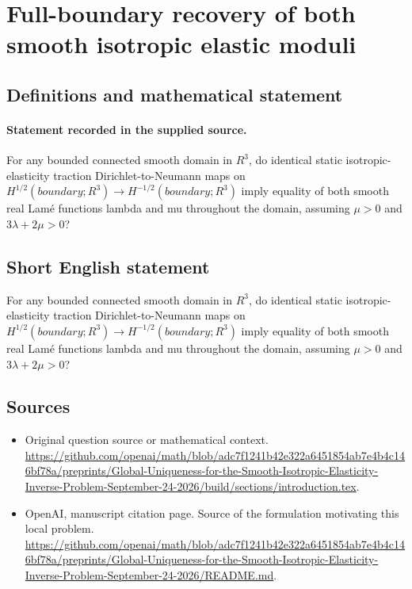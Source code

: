 \documentclass[11pt]{article}
\begin{document}
\section*{Full-boundary recovery of both smooth isotropic elastic moduli}\label{statement}
\subsection{Definitions and mathematical statement}
\paragraph{Statement recorded in the supplied source.}
For any bounded connected smooth domain in $R^3$, do identical static isotropic-elasticity traction Dirichlet-to-Neumann maps on $H^{1/2}(boundary;R^3)\to H^{-1/2}(boundary;R^3)$ imply equality of both smooth real Lamé functions lambda and mu throughout the domain, assuming $\mu >0$ and $3\lambda +2\mu >0$?
\subsection{Short English statement}
For any bounded connected smooth domain in $R^3$, do identical static isotropic-elasticity traction Dirichlet-to-Neumann maps on $H^{1/2}(boundary;R^3)\to H^{-1/2}(boundary;R^3)$ imply equality of both smooth real Lamé functions lambda and mu throughout the domain, assuming $\mu >0$ and $3\lambda +2\mu >0$?
\subsection{Sources}
\begin{itemize}
\item[S1] Original question source or mathematical context.
\url{https://github.com/openai/math/blob/adc7f1241b42e322a6451854ab7e4b4c146bf78a/preprints/Global-Uniqueness-for-the-Smooth-Isotropic-Elasticity-Inverse-Problem-September-24-2026/build/sections/introduction.tex}.
\item[S2] OpenAI, manuscript citation page. Source of the formulation motivating this local problem.
\url{https://github.com/openai/math/blob/adc7f1241b42e322a6451854ab7e4b4c146bf78a/preprints/Global-Uniqueness-for-the-Smooth-Isotropic-Elasticity-Inverse-Problem-September-24-2026/README.md}.
\end{itemize}
\end{document}
